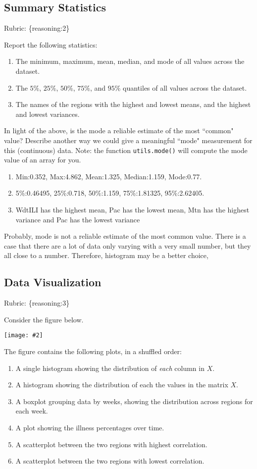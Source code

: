 \documentclass{article}
\def\rubric#1{\gre{Rubric: \{#1\}}}{}
\def\blu#1{{\color{blu}#1}}
\def\gre#1{{\color{gre}#1}}
\def\red#1{{\color{red}#1}}
\newcommand{\fig}[2]{\texttt{[image: \#2]}}
\def\enum#1{\begin{enumerate}#1\end{enumerate}}
\begin{document}
\subsection{Summary Statistics}
\rubric{reasoning:2}

\blu{Report the following statistics}:
\enum{
\item The minimum, maximum, mean, median, and mode of all values across the dataset.
\item The $5\%$, $25\%$, $50\%$, $75\%$, and $95\%$ quantiles of all values across the dataset.
\item The names of the regions with the highest and lowest means, and the highest and lowest variances.
}
In light of the above, \blu{is the mode a reliable estimate of the most ``common" value? Describe another way we could give a meaningful ``mode" measurement for this (continuous) data.} Note: the function \texttt{utils.mode()} will compute the mode value of an array for you.

\red{
\begin{enumerate}
    \item Min:0.352, Max:4.862, Mean:1.325, Median:1.159, Mode:0.77.
    \item 5\%:0.46495, 25\%:0.718, 50\%:1.159, 75\%:1.81325, 95\%:2.62405.
    \item WdtILI has the highest mean, Pac has the lowest mean, Mtn has the highest variance and Pac has the lowest variance
\end{enumerate}
Probably, mode is not a reliable estimate of the most common value. There is a case that there are a lot of data only varying with a very small number, but they all close to a number.
Therefore, histogram may be a better choice,
}


\subsection{Data Visualization}
\rubric{reasoning:3}

Consider the figure below.

\fig{1}{../figs/visualize-unlabeled}

The figure contains the following plots, in a shuffled order:
\enum{
\item A single histogram showing the distribution of \emph{each} column in $X$.
\item A histogram showing the distribution of each the values in the matrix $X$.
\item A boxplot grouping data by weeks, showing the distribution across regions for each week.
\item A plot showing the illness percentages over time.
\item A scatterplot between the two regions with highest correlation.
\item A scatterplot between the two regions with lowest correlation.
}
\end{document}

